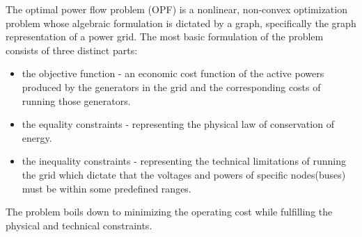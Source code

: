 The optimal power flow problem (OPF) is a nonlinear, non-convex optimization problem\cite{cain2012history, bienstock2019strong} whose algebraic formulation is dictated by a graph,
specifically the graph representation of a power grid.
The most basic formulation of the problem consists of three distinct parts:

\begin{itemize}
    \item the objective function - an economic cost function of the active powers produced by the generators in
    the grid and the corresponding costs of running those generators.

    \item the equality constraints - representing the physical law of conservation of energy.

    \item the inequality constraints - representing the technical limitations of running the grid which dictate that
    the voltages and powers of specific nodes(buses) must be within some predefined ranges.
\end{itemize}

\noindent The problem boils down to minimizing the operating cost while fulfilling the physical and technical constraints.